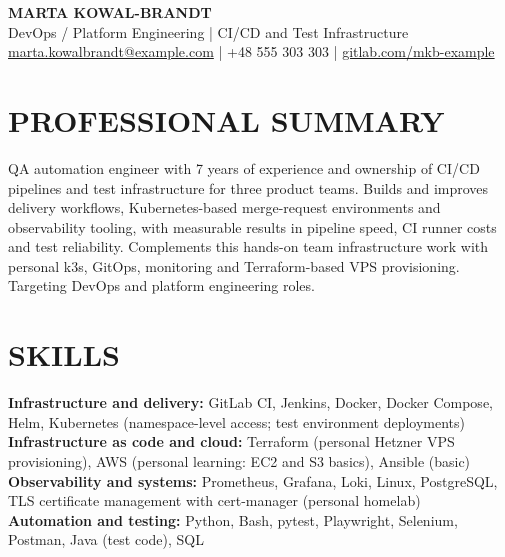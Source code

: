 \documentclass[11pt,a4paper]{article}
\begin{document}
\begin{center}
{\Huge\bfseries\color{primarycolor} MARTA KOWAL-BRANDT}\\[0.3em]
{\large\color{accentcolor} DevOps / Platform Engineering | CI/CD and Test Infrastructure}\\[0.25em]
\href{mailto:marta.kowalbrandt@example.com}{marta.kowalbrandt@example.com} | +48 555 303 303 | \href{https://gitlab.com/mkb-example}{gitlab.com/mkb-example}
\end{center}
\vspace{-0.5em}

\section*{PROFESSIONAL SUMMARY}
QA automation engineer with 7 years of experience and ownership of CI/CD pipelines and test infrastructure for three product teams. Builds and improves delivery workflows, Kubernetes-based merge-request environments and observability tooling, with measurable results in pipeline speed, CI runner costs and test reliability. Complements this hands-on team infrastructure work with personal k3s, GitOps, monitoring and Terraform-based VPS provisioning. Targeting DevOps and platform engineering roles.

\section*{SKILLS}
\textbf{Infrastructure and delivery:} GitLab CI, Jenkins, Docker, Docker Compose, Helm, Kubernetes (namespace-level access; test environment deployments)\\
\textbf{Infrastructure as code and cloud:} Terraform (personal Hetzner VPS provisioning), AWS (personal learning: EC2 and S3 basics), Ansible (basic)\\
\textbf{Observability and systems:} Prometheus, Grafana, Loki, Linux, PostgreSQL, TLS certificate management with cert-manager (personal homelab)\\
\textbf{Automation and testing:} Python, Bash, pytest, Playwright, Selenium, Postman, Java (test code), SQL
\end{document}
